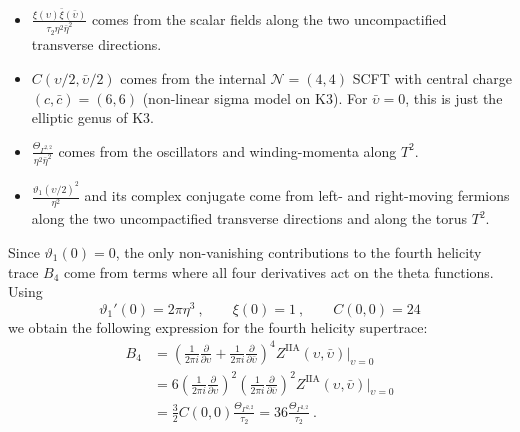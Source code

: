 \documentclass[a4paper,11pt]{article}
\newcommand{\N}{\mathcal{N}}
\numberwithin{equation}{section}
\def\be{\begin{equation}}
\def\ee{\end{equation}}
\begin{document}
\begin{itemize}
\item $\frac{\xi(\upsilon)\bar\xi(\bar\upsilon)}{\tau_2\eta^2\bar\eta^2}$ 
 comes from the scalar fields along the two uncompactified transverse directions.
 \item $C%
 (\upsilon/2,\bar\upsilon/2)$ comes from the internal $\N=(4,4)$ SCFT with central charge $(c,\bar c)=(6,6)$ (non-linear sigma model on K3). For $\bar \upsilon=0$, this is just the elliptic genus of K3.
\item $\frac{\Theta_{\Gamma^{2,2}} }{\eta^2\bar\eta^2}$ comes from the oscillators and winding-momenta along $T^2$.
\item $\frac{\vartheta_1(\upsilon/2)^2}{\eta^2}$ and its complex conjugate come from left- and right-moving fermions along the two uncompactified transverse directions and along the torus $T^2$.
\end{itemize}
Since $\vartheta _1(0)=0$, the only non-vanishing contributions to the fourth helicity trace $B_4$  come from terms where all four derivatives act on the theta functions. Using
\be \vartheta_1'(0)=2\pi \eta^3\ ,\qquad \xi(0)=1\ ,\qquad C%
(0,0)=24
\ee we obtain the following expression for the fourth helicity supertrace:
\be
\begin{split}
 B_4&=\left(\frac{1}{2\pi i} \frac{\partial}{\partial \upsilon}+\frac{1}{2\pi i} \frac{\partial}{\partial \bar\upsilon}\right)^4 Z^{\text{IIA}}(\upsilon,\bar \upsilon)\Big|_{ \upsilon=0}
 \nonumber \\
 &= 6\left(\frac{1}{2\pi i} \frac{\partial}{\partial \upsilon}\right)^2\left(\frac{1}{2\pi i} \frac{\partial}{\partial \bar\upsilon}\right)^2 Z^{\text{IIA}}(\upsilon,\bar \upsilon)\Big|_{ \upsilon=0}
 \nonumber \\
 &=\frac{3}{2} C%
 (0,0)\frac{\Theta_{\Gamma^{2,2}} }{\tau_2}
 =36\frac{\Theta_{\Gamma^{2,2}} }{\tau_2}\ .
 \end{split}\ee
 
\end{document}
